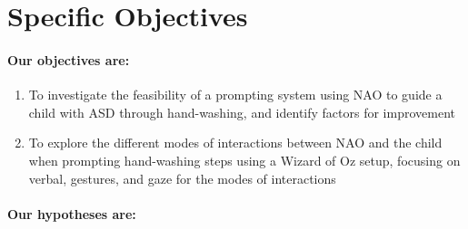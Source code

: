 \section{Specific Objectives}

\paragraph{Our objectives are:}
\begin{enumerate}
	\item To investigate the feasibility of a prompting system using NAO to guide a child with ASD through hand-washing, and identify factors for improvement
	
	\item To explore the different modes of interactions between NAO and the child when prompting hand-washing steps using a Wizard of Oz setup, focusing on verbal, gestures, and gaze for the modes of interactions
	
\end{enumerate}



\paragraph{Our hypotheses are:}









